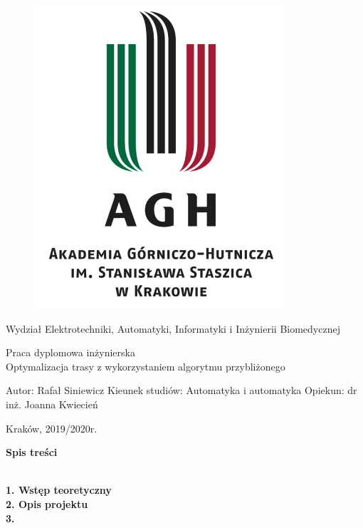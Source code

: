 \documentclass[a4paper, twoside, 12pt]{article}
\begin{document}
	
	\begin{figure}[t]
		\includegraphics[scale=0.8]{AGH}
		\centering
	\end{figure}
	
	\begin{center}
		Wydział Elektrotechniki, Automatyki, Informatyki i Inżynierii Biomedycznej 
		\vspace{10mm} %
	
		Praca dyplomowa inżynierska \\ 
		\vspace{10mm}
		Optymalizacja trasy z wykorzystaniem algorytmu przybliżonego
	\end{center}
	
	\vfill
	\begin{flushleft}
		Autor: Rafał Siniewicz \newline
		Kieunek studiów: Automatyka i automatyka \newline 
		Opiekun: dr inż. Joanna Kwiecień \newline
	
	\end{flushleft}
	
	\begin{center}Kraków, 2019/2020r.\end{center}
	
	\newpage
	
	\begin{flushleft}
		\begin{large}\textbf{Spis treści}\end{large}
		\textbf{
			\\1. Wstęp teoretyczny\\
			2. Opis projektu\\
			3. 
		}
	\end{flushleft}
	\newpage
	
\end{document}
